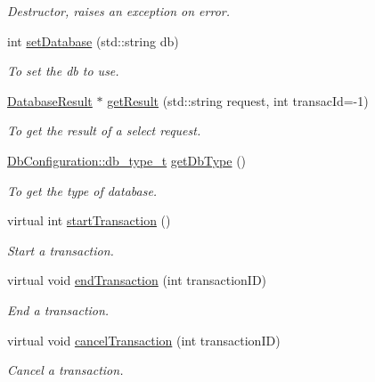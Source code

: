 \begin{DoxyCompactItemize}
\begin{DoxyCompactList}\small\item\em Destructor, raises an exception on error. \item\end{DoxyCompactList}\item 
int \hyperlink{classPOSTGREDatabase_acadff2a3649a40b323eb7711e0d705cf}{setDatabase} (std::string db)
\begin{DoxyCompactList}\small\item\em To set the db to use. \item\end{DoxyCompactList}\item 
\hyperlink{classDatabaseResult}{DatabaseResult} $\ast$ \hyperlink{classPOSTGREDatabase_a1ec869cd220eacd6833b7f47388023fc}{getResult} (std::string request, int transacId=-\/1)
\begin{DoxyCompactList}\small\item\em To get the result of a select request. \item\end{DoxyCompactList}\item 
\hyperlink{classDbConfiguration_a4a57e43a5017a5c4833a784a994c91cf}{DbConfiguration::db\_\-type\_\-t} \hyperlink{classPOSTGREDatabase_a6f446f99cff05695b37165ee0ce22a9a}{getDbType} ()
\begin{DoxyCompactList}\small\item\em To get the type of database. \item\end{DoxyCompactList}\item 
virtual int \hyperlink{classPOSTGREDatabase_a3257276f03c981dd6bb4b61d0cd0f863}{startTransaction} ()
\begin{DoxyCompactList}\small\item\em Start a transaction. \item\end{DoxyCompactList}\item 
virtual void \hyperlink{classPOSTGREDatabase_a5fb689587cff7610949dd8ae0c14a321}{endTransaction} (int transactionID)
\begin{DoxyCompactList}\small\item\em End a transaction. \item\end{DoxyCompactList}\item 
virtual void \hyperlink{classPOSTGREDatabase_af511e1e797dbd05dcb582d3f9603392f}{cancelTransaction} (int transactionID)
\begin{DoxyCompactList}\small\item\em Cancel a transaction. \item\end{DoxyCompactList}\item 

\end{DoxyCompactItemize}
